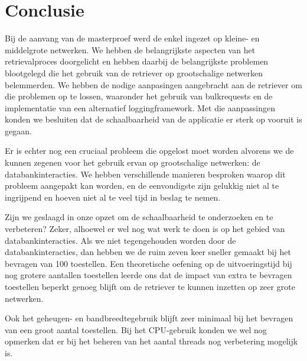 \chapter*{Conclusie}

Bij de aanvang van de masterproef werd de \nwmretriever{} enkel ingezet op kleine- en middelgrote netwerken.
We hebben de belangrijkste aspecten van het retrievalproces doorgelicht en hebben daarbij de belangrijkste problemen blootgelegd die
het gebruik van de retriever op grootschalige netwerken belemmerden.
We hebben de nodige aanpasingen aangebracht aan de retriever om die problemen op te lossen,
waaronder het gebruik van bulkrequests en de implementatie van een alternatief loggingframework.
Met die aanpassingen konden we besluiten dat de schaalbaarheid van de applicatie er sterk op vooruit is gegaan.

Er is echter nog een cruciaal probleem die opgelost moet worden alvorens we de \nwmretriever{} kunnen zegenen voor het gebruik ervan op grootschalige netwerken:
de databankinteracties.
We hebben verschillende manieren besproken waarop dit probleem aangepakt kan worden,
en de eenvoudigste zijn gelukkig niet al te ingrijpend en hoeven niet al te veel tijd in beslag te nemen.

Zijn we geslaagd in onze opzet om de schaalbaarheid te onderzoeken en te verbeteren?
Zeker, alhoewel er wel nog wat werk te doen is op het gebied van databankinteracties.
Als we niet tegengehouden worden door de databankinteracties, dan hebben we de \nwmretriever{} ruim zeven keer sneller gemaakt bij het bevragen van 100 toestellen.
Een theoretische oefening op de uitvoeringstijd bij nog grotere aantallen toestellen leerde ons dat de impact van extra te bevragen toestellen beperkt genoeg blijft
om de retriever te kunnen inzetten op zeer grote netwerken.

Ook het geheugen- en bandbreedtegebruik blijft zeer minimaal bij het bevragen van een groot aantal toestellen.
Bij het CPU-gebruik konden we wel nog opmerken dat er bij het beheren van het aantal threads nog verbetering mogelijk is.



